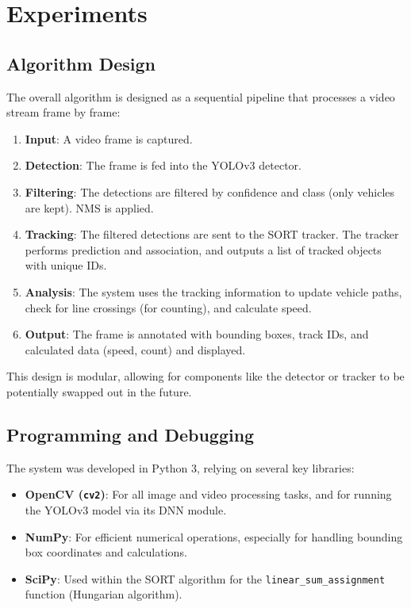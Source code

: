 \documentclass{article}
\begin{document}
\section{Experiments}

\subsection{Algorithm Design}

The overall algorithm is designed as a sequential pipeline that processes a video stream frame by frame:

\begin{enumerate}
    \item \textbf{Input}: A video frame is captured.
    \item \textbf{Detection}: The frame is fed into the YOLOv3 detector.
    \item \textbf{Filtering}: The detections are filtered by confidence and class (only vehicles are kept). NMS is applied.
    \item \textbf{Tracking}: The filtered detections are sent to the SORT tracker. The tracker performs prediction and association, and outputs a list of tracked objects with unique IDs.
    \item \textbf{Analysis}: The system uses the tracking information to update vehicle paths, check for line crossings (for counting), and calculate speed.
    \item \textbf{Output}: The frame is annotated with bounding boxes, track IDs, and calculated data (speed, count) and displayed.
\end{enumerate}

This design is modular, allowing for components like the detector or tracker to be potentially swapped out in the future.

\subsection{Programming and Debugging}

The system was developed in Python 3, relying on several key libraries:
\begin{itemize}
    \item \textbf{OpenCV (\texttt{cv2})}: For all image and video processing tasks, and for running the YOLOv3 model via its DNN module.
    \item \textbf{NumPy}: For efficient numerical operations, especially for handling bounding box coordinates and calculations.
    \item \textbf{SciPy}: Used within the SORT algorithm for the \texttt{linear\_sum\_assignment} function (Hungarian algorithm).
\end{itemize}
\end{document}
